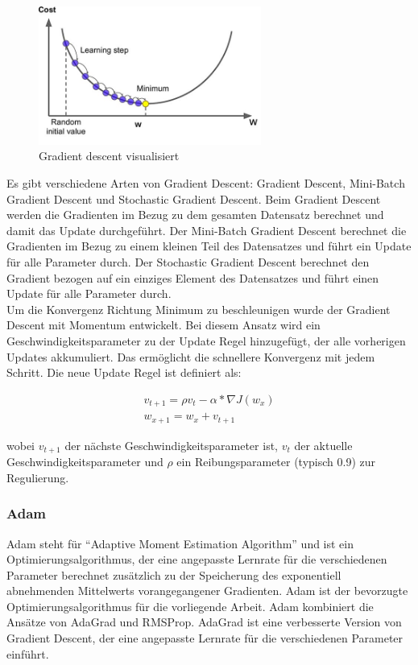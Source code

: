 \begin{figure}[H]
  \centering
  \includegraphics[width=0.65\textwidth]{resources/cnn/gradient-descent.jpg}
  \caption{
    Gradient descent visualisiert
    \cite{gradient-descent}
  }
  \label{image:gradient-descent}
\end{figure}

Es gibt verschiedene Arten von Gradient Descent: Gradient Descent, Mini-Batch Gradient Descent und Stochastic Gradient Descent. 
Beim Gradient Descent
werden die Gradienten im Bezug zu dem gesamten Datensatz berechnet und damit das Update durchgeführt. Der Mini-Batch Gradient Descent berechnet 
die Gradienten im Bezug zu einem kleinen Teil des Datensatzes und führt ein Update für alle Parameter durch. Der Stochastic Gradient Descent 
berechnet den Gradient bezogen auf ein einziges Element des Datensatzes und führt einen Update für alle Parameter durch.
\\
Um die Konvergenz Richtung Minimum zu beschleunigen wurde der Gradient Descent mit Momentum entwickelt. Bei diesem Ansatz wird ein
Geschwindigkeitsparameter zu der Update Regel hinzugefügt, der alle vorherigen Updates akkumuliert. 
Das ermöglicht die schnellere Konvergenz mit jedem Schritt. Die neue Update Regel ist definiert als:

\begin{equation}
  \begin{gathered}
    v_{t+1} = \rho v_t - \alpha * \nabla J(w_x) \\
    w_{x+1} = w_x + v_{t+1}
  \end{gathered}
\end{equation}

wobei $v_{t+1}$ der nächste Geschwindigkeitsparameter ist, $v_t$ der aktuelle Geschwindigkeitsparameter und $\rho$ ein Reibungsparameter 
(typisch 0.9) zur Regulierung.

\subsubsection{Adam}
Adam steht für ``Adaptive Moment Estimation Algorithm'' und ist ein Optimierungsalgorithmus, der eine angepasste Lernrate für die verschiedenen
Parameter berechnet \cite{kingma2014adam} zusätzlich zu der Speicherung des exponentiell abnehmenden Mittelwerts vorangegangener Gradienten.
Adam ist der bevorzugte Optimierungsalgorithmus für die vorliegende Arbeit. 
Adam kombiniert die Ansätze von AdaGrad \cite{duchi2011adaptive} und RMSProp. AdaGrad ist eine 
verbesserte Version von Gradient Descent, der eine angepasste Lernrate für die verschiedenen Parameter einführt. 

